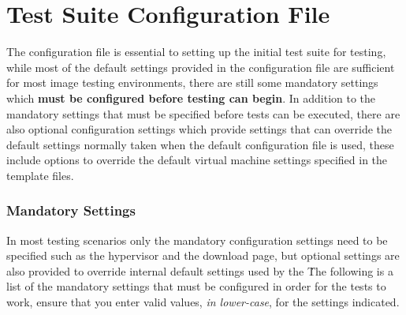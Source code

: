 \chapter{Test Suite Configuration File}
\label{sct:configfile}

The configuration file is essential to setting up the initial \cernvm test suite for testing, while most of the default 
settings provided in the configuration file are sufficient for most \cernvm image testing environments, there are still
some mandatory settings which {\bf must be configured before testing can begin}. In addition to the mandatory settings
that must be specified before tests can be executed, there are also optional configuration settings which provide settings
that can override the default settings normally taken when the default configuration file is used, these include options
to override the default virtual machine settings specified in the template files.




\subsection{Mandatory Settings}
\label{sct:mandatorysettings}

In most testing scenarios only the mandatory configuration settings need to be specified such as the hypervisor and 
the download page, but optional settings are also provided to override internal default settings used by the 
\cernvmtestframework\. The following is a list of the mandatory settings that must be configured in order for the
tests to work, ensure that you enter valid values, \emph{in lower-case}, for the settings indicated.



